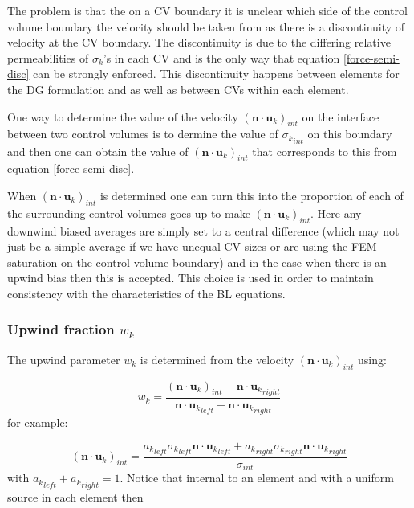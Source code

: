 The problem is that the on a CV boundary it is unclear
which side of the control volume boundary the velocity
should be taken from as there is a discontinuity
of velocity at the CV boundary. The discontinuity
is due to the differing relative permeabilities of
$\sigma_k$'s in each CV and is the only way that
equation \ref{force-semi-disc} can be strongly enforced.
This discontinuity happens between elements for the DG
formulation and as well as between CVs within each element.

One way to determine the value of the velocity
$({{\mathbf n}\cdot{\mathbf u}_k})_{int}$
on the interface between two control volumes
is to dermine the value of ${\sigma_k}_{int}$ on this boundary
and then one can obtain the value of
$({{\mathbf n}\cdot{\mathbf u}_k})_{int}$ that
corresponds to this from equation \ref{force-semi-disc}.

When $({{\mathbf n}\cdot{\mathbf u}_k})_{int}$
is determined one can turn this
into the proportion of each of the surrounding control
volumes goes up to make
$({{\mathbf n}\cdot{\mathbf u}_k})_{int}$. Here any downwind
biased averages are simply set to a central difference
(which may not just be a simple average if we have
unequal CV sizes or are using the FEM saturation
on the control volume boundary) and in the case
when there is an upwind bias then this is accepted.
This choice is used in order to maintain consistency
with the characteristics of the BL equations.

\subsubsection{Upwind fraction $w_k$}
The upwind parameter $w_k$ is
determined from the velocity
$({{\mathbf n}\cdot{\mathbf u}_k})_{int}$ using:

\begin{equation}
w_k= \frac{({{\mathbf n}\cdot{\mathbf u}_k})_{int} - {{\mathbf n}\cdot{\mathbf u}_k}_{right}}{{{\mathbf n}\cdot{\mathbf u}_k}_{left} - {{\mathbf n}\cdot{\mathbf u}_k}_{right}}
\label{w_k}
\end{equation}
for example:

\begin{equation}
({{\mathbf n}\cdot{\mathbf u}_k})_{int}= \frac{{a_k}_{left} {\sigma_k}_{left} {{\mathbf n}\cdot{\mathbf u}_k}_{left} + {a_k}_{right} {\sigma_k}_{right} {{\mathbf n}\cdot{\mathbf u}_k}_{right}}{\sigma_{int}}
\end{equation}
with ${a_k}_{left}+{a_k}_{right}=1$.
Notice that internal to an element and with a uniform
source in each element then

